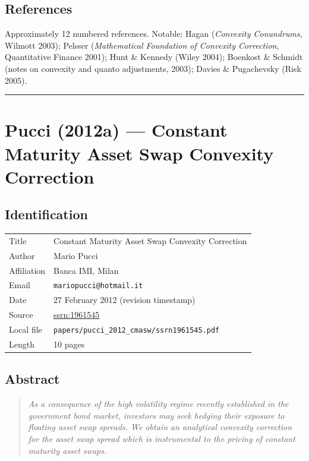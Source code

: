 \documentclass[11pt,a4paper]{article}
\begin{document}
\subsection*{References}
Approximately 12 numbered references. Notable: Hagan (\emph{Convexity Conundrums}, Wilmott 2003); Pelsser (\emph{Mathematical Foundation of Convexity Correction}, Quantitative Finance 2001); Hunt \& Kennedy (Wiley 2004); Boenkost \& Schmidt (notes on convexity and quanto adjustments, 2003); Davies \& Pugachevsky (Risk 2005).

\bigskip\hrule\bigskip

\section{Pucci (2012a) --- Constant Maturity Asset Swap Convexity Correction}
\label{bib:pucci-2012-cmasw}

\subsection*{Identification}
\begin{tabular}{@{}p{3.5cm}p{11cm}@{}}
\toprule
Title           & Constant Maturity Asset Swap Convexity Correction \\
Author          & Mario Pucci \\
Affiliation     & Banca IMI, Milan \\
Email           & \texttt{mariopucci@hotmail.it} \\
Date            & 27 February 2012 (revision timestamp) \\
Source          & \href{https://ssrn.com/abstract=1961545}{ssrn:1961545} \\
Local file      & \texttt{papers/pucci\_2012\_cmasw/ssrn1961545.pdf} \\
Length          & 10 pages \\
\bottomrule
\end{tabular}

\subsection*{Abstract}
\begin{quote}\itshape
As a consequence of the high volatility regime recently established
in the government bond market, investors may seek hedging their
exposure to floating asset swap spreads. We obtain an analytical
convexity correction for the asset swap spread which is instrumental
to the pricing of constant maturity asset swaps.
\end{quote}
\end{document}
